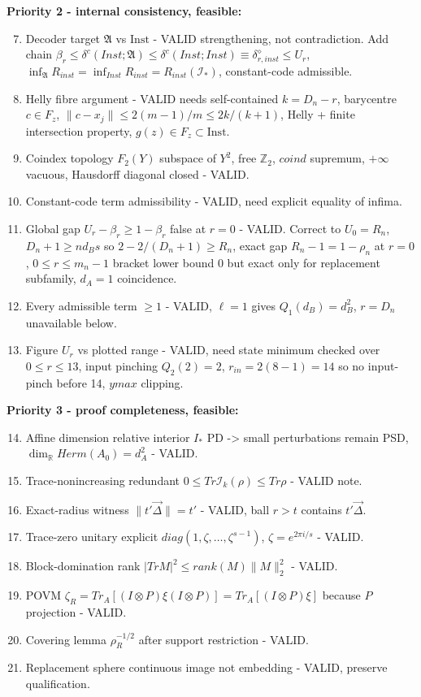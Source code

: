 \documentclass[11pt,a4paper]{article}
\newcommand{\Inst}{\mathrm{Inst}}
\begin{document}
\textbf{Priority 2 - internal consistency, feasible:}
\begin{enumerate}
\setcounter{enumi}{6}
\item Decoder target $\mathfrak A$ vs $\Inst$ - VALID strengthening, not contradiction. Add chain $\beta_r\le\delta^c(Inst;\mathfrak A)\le\delta^c(Inst;Inst)\equiv\delta_{r,inst}^\diamond\le U_r$, $\inf_{\mathfrak A}R_{inst}=\inf_{Inst}R_{inst}=R_{inst}(\mathcal I_*)$, constant-code admissible.
\item Helly fibre argument - VALID needs self-contained $k=D_n-r$, barycentre $c\in F_z$, $\|c-x_j\|\le2(m-1)/m\le2k/(k+1)$, Helly + finite intersection property, $g(z)\in F_z\subset\Inst$.
\item Coindex topology $F_2(Y)$ subspace of $Y^2$, free $\mathbb Z_2$, $coind$ supremum, $+\infty$ vacuous, Hausdorff diagonal closed - VALID.
\item Constant-code term admissibility - VALID, need explicit equality of infima.
\item Global gap $U_r-\beta_r\ge1-\beta_r$ false at $r=0$ - VALID. Correct to $U_0=R_n$, $D_n+1\ge nd_Bs$ so $2-2/(D_n+1)\ge R_n$, exact gap $R_n-1=1-\rho_n$ at $r=0$, $0\le r\le m_n-1$ bracket lower bound $0$ but exact only for replacement subfamily, $d_A=1$ coincidence.
\item Every admissible term $\ge1$ - VALID, $\ell=1$ gives $Q_1(d_B)=d_B^2$, $r=D_n$ unavailable below.
\item Figure $U_r$ vs plotted range - VALID, need state minimum checked over $0\le r\le13$, input pinching $Q_2(2)=2$, $r_{in}=2(8-1)=14$ so no input-pinch before 14, $ymax$ clipping.
\end{enumerate}

\textbf{Priority 3 - proof completeness, feasible:}
\begin{enumerate}
\setcounter{enumi}{13}
\item Affine dimension relative interior $I_*$ PD -> small perturbations remain PSD, $\dim_{\mathbb R}Herm(A_0)=d_A^2$ - VALID.
\item Trace-nonincreasing redundant $0\le Tr\mathcal I_k(\rho)\le Tr\rho$ - VALID note.
\item Exact-radius witness $ \|t'\vec\Delta\|=t'$ - VALID, ball $r>t$ contains $t'\vec\Delta$.
\item Trace-zero unitary explicit $diag(1,\zeta,\dots,\zeta^{s-1})$, $\zeta=e^{2\pi i/s}$ - VALID.
\item Block-domination rank $|Tr M|^2\le rank(M)\|M\|_2^2$ - VALID.
\item POVM $\zeta_R=Tr_A[(I\otimes P)\xi(I\otimes P)]=Tr_A[(I\otimes P)\xi]$ because $P$ projection - VALID.
\item Covering lemma $\rho_R^{-1/2}$ after support restriction - VALID.
\item Replacement sphere continuous image not embedding - VALID, preserve qualification.
\end{enumerate}
\end{document}
